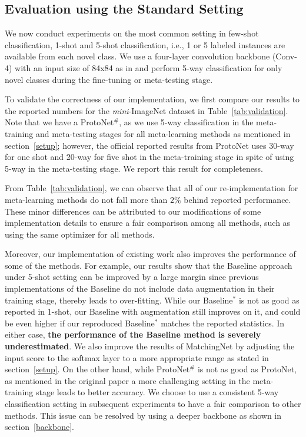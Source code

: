 \subsection{Evaluation using the Standard Setting}
\label{sec:standard}

We now conduct experiments on the most common setting in few-shot classification, 1-shot and 5-shot classification, i.e., 1 or 5 labeled instances are available from each novel class. We use a four-layer convolution backbone (Conv-4) with an input size of 84x84 as in \cite{snell2017prototypical} and perform 5-way classification for only novel classes during the fine-tuning or meta-testing stage.

To validate the correctness of our implementation, we first compare our results to the reported numbers for the \emph{mini}-ImageNet  dataset in Table~\ref{tab:validation}. Note that we have a ProtoNet$^\#$, as we use 5-way classification in the meta-training and meta-testing stages for all meta-learning methods as mentioned in section~\ref{setup}; however, the official reported results from ProtoNet uses 30-way for one shot and 20-way for five shot in the meta-training stage in spite of using 5-way in the meta-testing stage. We report this result for completeness.

From Table~\ref{tab:validation}, we can observe that all of our re-implementation for meta-learning methods do not fall more than $2\%$ behind reported performance. These minor differences can be attributed to  our modifications of some implementation details to ensure a fair comparison among all methods, such as using the same optimizer for all methods. 

Moreover, our implementation of existing work also improves the performance of some of the methods. For example, our results show that the Baseline approach under 5-shot setting can be improved by a large margin since previous implementations of the Baseline do not include data augmentation in their training stage, thereby leads to over-fitting. While our Baseline$^*$ is not as good as reported in 1-shot, our Baseline with augmentation still improves on it, and could be even higher if our reproduced Baseline$^*$ matches the reported statistics. In either case, \textbf{the performance of the Baseline method is severely underestimated}. We also improve the results of MatchingNet by adjusting the input score to the softmax layer to a more appropriate range as stated in section~\ref{setup}. On the other hand, while ProtoNet$^\#$ is not as good as ProtoNet, as mentioned in the original paper a more challenging setting in the meta-training stage leads to better accuracy.  We choose to use a consistent 5-way classification setting in subsequent experiments to have a fair comparison to other methods. This issue can be resolved by using a deeper backbone as shown in section~\ref{backbone}.

